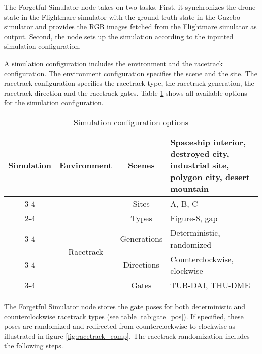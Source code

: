 The Forgetful Simulator node takes on two tasks.
First, it synchronizes the
drone state in the Flightmare simulator with the
ground-truth state in the Gazebo simulator and 
provides the RGB images fetched from the Flightmare simulator
as output.
Second, the node sets up the simulation
according to the inputted 
simulation configuration.

A simulation configuration 
includes the environment and the racetrack configuration.
The environment configuration specifies
the scene and the site.
The racetrack configuration
specifies the 
racetrack type, the racetrack generation,
the racetrack direction and the racetrack gates.
Table \ref{tab:sim_config_opts} shows all available options for the simulation configuration.
\begin{table}[h]
    \caption{Simulation configuration options
    \label{tab:sim_config_opts}}
    \centering
    \begin{tabular}{|c|c|c|p{6cm}|} \hline
        \multirow{8}{*}{Simulation} 
        &\multirow{4}{*}{Environment}   
        &\multirow{3}{*}{Scenes}
        &Spaceship interior, destroyed city, industrial site, polygon city, desert mountain    
        \\\cline{3-4}
        &
        &Sites
        &A, B, C
        \\\cline{2-4}
        &\multirow{4}{*}{Racetrack}
        &Types
        &Figure-8, gap                                                                         \\\cline{3-4}
        &
        &Generations
        &Deterministic, randomized
        \\\cline{3-4}
        &
        &Directions
        &Counterclockwise, clockwise
        \\\cline{3-4}
        &
        &Gates
        &TUB-DAI, THU-DME
        \\\hline
    \end{tabular}
\end{table}
The Forgetful Simulator node stores 
the gate poses for both 
deterministic and counterclockwise
racetrack types
(see table \ref{tab:gate_pos}).
If specified,
these poses are randomized
and redirected from counterclockwise to clockwise
as illustrated in figure \ref{fig:racetrack_comp}.
The racetrack randomization 
includes the following steps.

